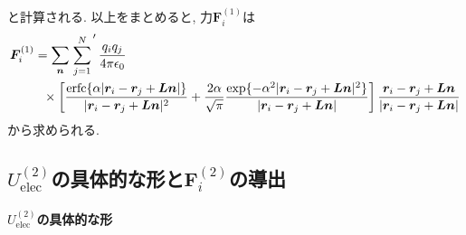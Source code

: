 と計算される. 以上をまとめると, 力$\bm{F}_{i}^{(1)}$は
\begin{align}
    \bm{F}_{i}^{(1)}
 &=
    \sum_{\bm{n}} \left.\sum_{j=1}^{N}\right.^{\prime}
    \frac{q_{i}q_{j}}{4 \pi \epsilon_{0}}
 \notag
 \\
 &~~\times
    \left[
           \frac{\mathrm{erfc} \{ \alpha |\bm{r}_{i} - \bm{r}_{j} + \bm{Ln}| \} }
                {|\bm{r}_{i} - \bm{r}_{j} + \bm{Ln}|^{2}}
          +\frac{2 \alpha}{\sqrt{\pi}}
           \frac{\exp \{-\alpha^{2} |\bm{r}_{i} - \bm{r}_{j} + \bm{Ln}|^{2} \}}
                {|\bm{r}_{i} - \bm{r}_{j} + \bm{Ln}|}
    \right]
 \frac{ \bm{r}_{i} - \bm{r}_{j} + \bm{Ln} }
      {|\bm{r}_{i} - \bm{r}_{j} + \bm{Ln}|}
\end{align}
から求められる.

\subsection{$U_{\mathrm{elec}}^{(2)}$の具体的な形と$\bm{F}_{i}^{(2)}$の導出}
\paragraph{$U_{\mathrm{elec}}^{(2)}$の具体的な形} \


